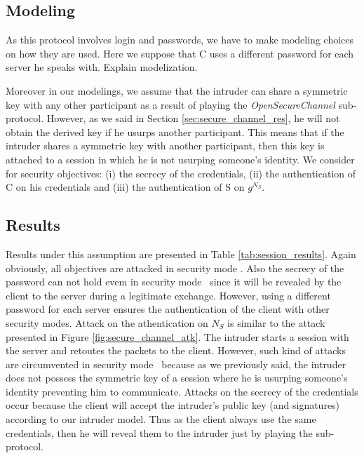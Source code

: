 \subsection{Modeling}

As this protocol involves login and passwords, we have to make modeling choices
on how they are used.
Here we suppose that C uses a different password for each server he speaks with.
\TODO Explain modelization.

Moreover in our modelings, we assume that the intruder can share a symmetric key
with any other participant as a result of playing the {\em OpenSecureChannel}
sub-protocol.
However, as we said in Section \ref{sec:secure_channel_res}, he will not obtain
the derived key if he usurps another participant.
This means that if the intruder shares a symmetric key with another participant,
then this key is attached to a session in which he is not usurping someone's
identity.
We consider for security objectives: (i) the secrecy of the credentials, (ii)
the authentication of C on his credentials and (iii) the authentication of S on
$g^{N_{S}}$.

\subsection{Results}

Results under this assumption are presented in Table \ref{tab:session_results}.
Again obviously, all objectives are attacked in security mode \smn.
Also the secrecy of the password can not hold evem in security mode \sms~since
it will be revealed by the client to the server during a legitimate exchange.
However, using a different password for each server ensures the authentication
of the client with other security modes.
Attack on the athentication on $N_{S}$ is similar to the attack presented in
Figure \ref{fig:secure_channel_atk}.
The intruder starts a session with the server and retoutes the packets to the
client.
However, such kind of attacks are circumvented in security mode \smse~because
as we previously said, the intruder does not possess the symmetric key of a
session where he is usurping someone's identity preventing him to communicate.
Attacks on the secrecy of the credentials occur because the client will accept
the intruder's public key (and signatures) according to our intruder model.
Thus as the client always use the same credentials, then he will reveal them to
the intruder just by playing the sub-protocol.

